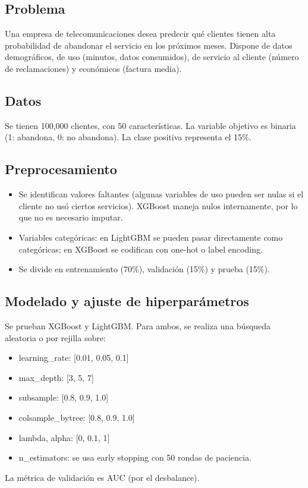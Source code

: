 \documentclass[12pt,a4paper,openany,oneside]{book}
\begin{document}
\subsection{Problema}
Una empresa de telecomunicaciones desea predecir qué clientes tienen alta probabilidad de abandonar el servicio en los próximos meses. Dispone de datos demográficos, de uso (minutos, datos consumidos), de servicio al cliente (número de reclamaciones) y económicos (factura media).

\subsection{Datos}
Se tienen 100,000 clientes, con 50 características. La variable objetivo es binaria (1: abandona, 0: no abandona). La clase positiva representa el 15\%.

\subsection{Preprocesamiento}
\begin{itemize}
    \item Se identifican valores faltantes (algunas variables de uso pueden ser nulas si el cliente no usó ciertos servicios). XGBoost maneja nulos internamente, por lo que no es necesario imputar.
    \item Variables categóricas: en LightGBM se pueden pasar directamente como categóricas; en XGBoost se codifican con one-hot o label encoding.
    \item Se divide en entrenamiento (70\%), validación (15\%) y prueba (15\%).
\end{itemize}

\subsection{Modelado y ajuste de hiperparámetros}
Se prueban XGBoost y LightGBM. Para ambos, se realiza una búsqueda aleatoria o por rejilla sobre:
\begin{itemize}
    \item learning\_rate: [0.01, 0.05, 0.1]
    \item max\_depth: [3, 5, 7]
    \item subsample: [0.8, 0.9, 1.0]
    \item colsample\_bytree: [0.8, 0.9, 1.0]
    \item lambda, alpha: [0, 0.1, 1]
    \item n\_estimators: se usa early stopping con 50 rondas de paciencia.
\end{itemize}
La métrica de validación es AUC (por el desbalance).
\end{document}
